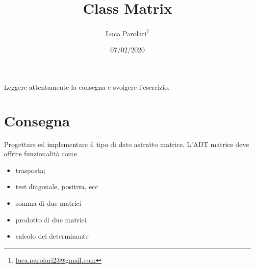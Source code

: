 \documentclass[addpoints,12pt,answers]{exam}
\author{Luca Parolari\footnote{\href{mailto:luca.parolari23@gmail.com}{luca.parolari23@gmail.com}}}
\begin{document}
    
    \title{Class Matrix}
    \date{07/02/2020}
    
    \maketitle
    
    Leggere attentamente la consegna e svolgere l'esercizio.
    
    \section{Consegna}
    Progettare ed implementare il tipo di dato astratto matrice. L'ADT matrice deve offrire funzionalità come
    \begin{itemize}
        \item trasposta;
        \item test diagonale, positiva, ecc
        \item somma di due matrici
        \item prodotto di due matrici
        \item calcolo del determinante
    \end{itemize}
    
\end{document}
